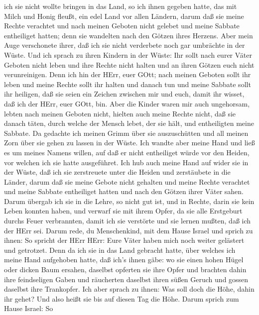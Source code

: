 ich sie nicht wollte bringen in das Land, so ich ihnen gegeben hatte,
das mit Milch und Honig fleußt, ein edel Land vor allen Ländern,
 darum daß sie meine Rechte verachtet und nach meinen
Geboten nicht gelebet und meine Sabbate entheiliget hatten; denn sie
wandelten nach den Götzen ihres Herzens.  Aber mein Auge
verschonete ihrer, daß ich sie nicht verderbete noch gar umbrächte in
der Wüste.  Und ich sprach zu ihren Kindern in der Wüste:
Ihr sollt nach eurer Väter Geboten nicht leben und ihre Rechte nicht
halten und an ihren Götzen euch nicht verunreinigen.  Denn
ich hin der HErr, euer GOtt; nach meinen Geboten sollt ihr leben und
meine Rechte sollt ihr halten und danach tun  und meine
Sabbate sollt ihr heiligen, daß sie seien ein Zeichen zwischen mir und
euch, damit ihr wisset, daß ich der HErr, euer GOtt, bin. 
Aber die Kinder waren mir auch ungehorsam, lebten nach meinen Geboten
nicht, hielten auch meine Rechte nicht, daß sie danach täten, durch
welche der Mensch lebet, der sie hält, und entheiligten meine Sabbate.
Da gedachte ich meinen Grimm über sie auszuschütten und all meinen Zorn
über sie gehen zu lassen in der Wüste.  Ich wandte aber
meine Hand und ließ es um meines Namens willen, auf daß er nicht
entheiliget würde vor den Heiden, vor welchen ich sie hatte ausgeführet.
 Ich hub auch meine Hand auf wider sie in der Wüste, daß
ich sie zerstreuete unter die Heiden und zerstäubete in die Länder,
 darum daß sie meine Gebote nicht gehalten und meine Rechte
verachtet und meine Sabbate entheiliget hatten und nach den Götzen ihrer
Väter sahen.  Darum übergab ich sie in die Lehre, so nicht
gut ist, und in Rechte, darin sie kein Leben konnten haben,
 und verwarf sie mit ihrem Opfer, da sie alle Erstgeburt
durchs Feuer verbrannten, damit ich sie verstörte und sie lernen mußten,
daß ich der HErr sei.  Darum rede, du Menschenkind, mit dem
Hause Israel und sprich zu ihnen: So spricht der HErr HErr: Eure Väter
haben mich noch weiter gelästert und getrotzet.  Denn da
ich sie in das Land gebracht hatte, über welches ich meine Hand
aufgehoben hatte, daß ich's ihnen gäbe: wo sie einen hohen Hügel oder
dicken Baum ersahen, daselbst opferten sie ihre Opfer und brachten dahin
ihre feindseligen Gaben und räucherten daselbst ihren süßen Geruch und
gossen daselbst ihre Trankopfer.  Ich aber sprach zu ihnen:
Was soll doch die Höhe, dahin ihr gehet? Und also heißt sie bis auf
diesen Tag die Höhe.  Darum sprich zum Hause Israel: So
